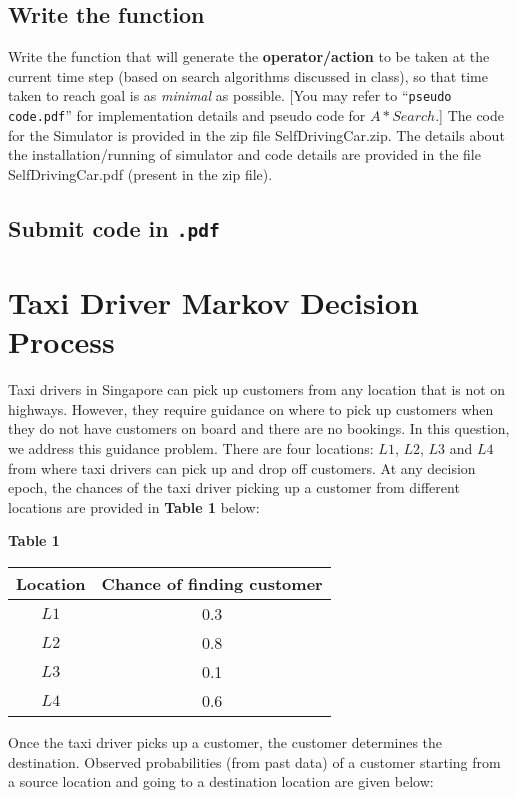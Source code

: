 \documentclass[12pt, letterpaper]{article}
\begin{document}
\subsection{Write the function}
Write the function that will generate the \textbf{operator/action} to be taken at the current time step (based on search algorithms discussed in class), so that time taken to reach goal is as \textit{minimal} as possible. [You may refer to “\texttt{pseudo code.pdf}” for implementation details and pseudo code for $A* Search$.]
The code for the Simulator is provided in the zip file SelfDrivingCar.zip. The details about the
installation/running of simulator and code details are provided in the file SelfDrivingCar.pdf
(present in the zip file).

\subsection{Submit code in \texttt{.pdf}}

\section{Taxi Driver Markov Decision Process}
Taxi drivers in Singapore can pick up customers from any location that is not on highways. 
However, they require guidance on where to pick up customers when they do not have customers on board and there are no bookings. 
In this question, we address this guidance problem. 
There are four locations: $L1$, $L2$, $L3$ and $L4$ from where taxi drivers can pick up and drop off customers. 
At any decision epoch, the chances of the taxi driver picking up a customer from different locations are provided in \textbf{Table 1} below:

\begin{center}
    \textbf{Table 1}

    \begin{tabular}{|c|c|} 
    \hline
    Location & Chance of finding customer\\ 
    \hline
    $L1$ & 0.3 \\
    \hline
    $L2$ & 0.8 \\
    \hline
    $L3$ & 0.1 \\
    \hline
    $L4$ & 0.6 \\
    \hline
    \end{tabular}
    
\end{center}

Once the taxi driver picks up a customer, the customer determines the destination. Observed
probabilities (from past data) of a customer starting from a source location and going to a
destination location are given below:
\end{document}
